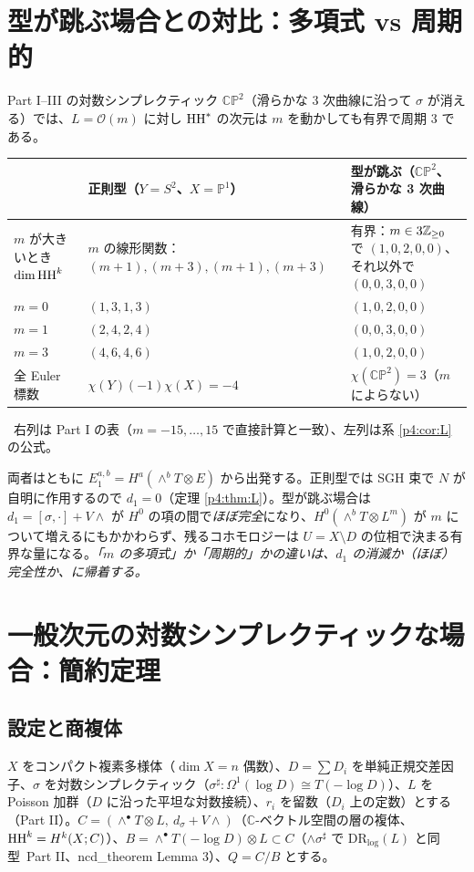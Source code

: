 \section{型が跳ぶ場合との対比：多項式 vs 周期的}\label{p4:sec:contrast}
Part I--III の対数シンプレクティック $\mathbb{CP}^2$（滑らかな 3 次曲線に沿って $\sigma$ が消える）では、$L=\mathcal O(m)$ に対し $\mathrm{HH}^*$ の次元は $m$ を動かしても有界で周期 3 である。
\begin{center}\small
\begin{tabular}{p{3.6cm}p{4.0cm}p{5.4cm}}\toprule
 & 正則型（$Y=S^2$、$X=\mathbb P^1$） & 型が跳ぶ（$\mathbb{CP}^2$、滑らかな 3 次曲線）\\\midrule
$m$ が大きいとき $\dim\mathrm{HH}^k$ & $m$ の線形関数：$(m+1),(m+3),(m+1),(m+3)$ & 有界：$m\in3\mathbb Z_{\ge0}$ で $(1,0,2,0,0)$、それ以外で $(0,0,3,0,0)$\\\midrule
$m=0$ & $(1,3,1,3)$ & $(1,0,2,0,0)$\\\midrule
$m=1$ & $(2,4,2,4)$ & $(0,0,3,0,0)$\\\midrule
$m=3$ & $(4,6,4,6)$ & $(1,0,2,0,0)$\\\midrule
全 Euler 標数 & $\chi(Y)(-1)\chi(X)=-4$ & $\chi(\mathbb{CP}^2)=3$（$m$ によらない）\\\bottomrule
\end{tabular}
\end{center}
\tV\ 右列は Part I の表（$m=-15,\dots,15$ で直接計算と一致）、左列は系 \ref{p4:cor:L} の公式。
\begin{obs}\tP\label{p4:obs:contrast}
両者はともに $E_1^{a,b}=H^a(\wedge^bT\otimes E)$ から出発する。正則型では SGH 束で $N$ が自明に作用するので $d_1=0$（定理 \ref{p4:thm:L}）。型が跳ぶ場合は $d_1=[\sigma,\cdot]+V\wedge$ が $H^0$ の項の間で\emph{ほぼ完全}になり、$H^0(\wedge^bT\otimes L^m)$ が $m$ について増えるにもかかわらず、残るコホモロジーは $U=X\setminus D$ の位相で決まる有界な量になる。\emph{「$m$ の多項式」か「周期的」かの違いは、$d_1$ の消滅か（ほぼ）完全性か、に帰着する。}
\end{obs}

\section{一般次元の対数シンプレクティックな場合：簡約定理}\label{p4:sec:log}
\subsection{設定と商複体}\label{p4:sec:Q}
$X$ をコンパクト複素多様体（$\dim X=n$ 偶数）、$D=\sum D_i$ を単純正規交差因子、$\sigma$ を対数シンプレクティック（$\sigma^\sharp:\Omega^1(\log D)\cong T(-\log D)$）、$L$ を Poisson 加群（$D$ に沿った平坦な対数接続）、$r_i$ を留数（$D_i$ 上の定数）とする（Part II）。$C=(\wedge^\bullet T\otimes L,\ d_\sigma+V\wedge)$（$\mathbb C$-ベクトル空間の層の複体、$\mathrm{HH}^k=H^k(X;C)$）、$B=\wedge^\bullet T(-\log D)\otimes L\subset C$（$\wedge\sigma^\sharp$ で $\mathrm{DR}_{\log}(L)$ と同型\tC\ Part II、ncd\_theorem Lemma 3）、$Q=C/B$ とする。

